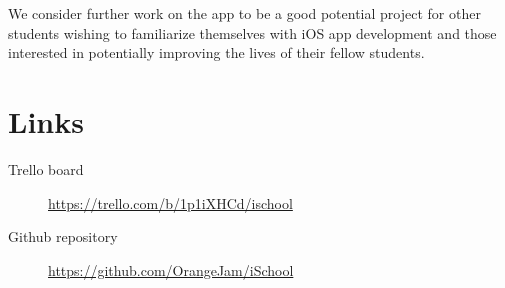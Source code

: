 \documentclass[pdftex, DIV=calc, paper=a4, fontsize=11pt, twocolumn]{scrartcl}	 %
\begin{document}
We consider further work on the app to be a good potential project for other students wishing to 
familiarize themselves with iOS app development and those interested in potentially improving the
lives of their fellow students. 


\section*{Links}

\begin{description}
    \item[Trello board] \url{https://trello.com/b/1p1iXHCd/ischool}
    \item[Github repository] \url{https://github.com/OrangeJam/iSchool}
\end{description}

\end{document}
